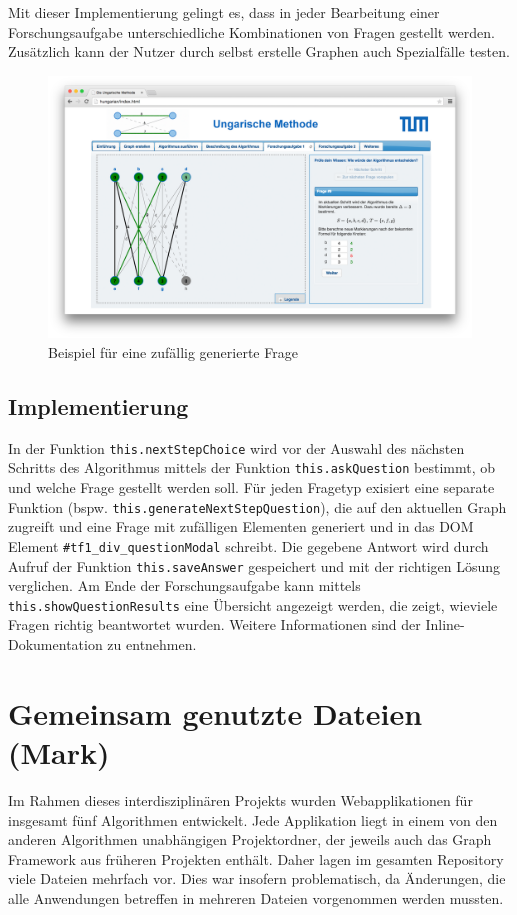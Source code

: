 Mit dieser Implementierung gelingt es, dass in jeder Bearbeitung einer Forschungsaufgabe unterschiedliche Kombinationen von Fragen gestellt werden. Zusätzlich kann der Nutzer durch selbst erstelle Graphen auch Spezialfälle testen.

\begin{figure}[h!]
	\centering
	\includegraphics[width=\textwidth]{figures/random_question}
	\caption[Zufällig generierte Frage]{Beispiel für eine zufällig generierte Frage}\label{fig:random-question}
\end{figure}

\subsection*{Implementierung}
In der Funktion \texttt{this.nextStepChoice} wird vor der Auswahl des nächsten Schritts des Algorithmus mittels der Funktion \texttt{this.askQuestion} bestimmt, ob und welche Frage gestellt werden soll. Für jeden Fragetyp exisiert eine separate Funktion (bspw. \texttt{this.generateNextStepQuestion}), die auf den aktuellen Graph zugreift und eine Frage mit zufälligen Elementen generiert und in das DOM Element \texttt{\#tf1\_div\_questionModal} schreibt. Die gegebene Antwort wird durch Aufruf der Funktion \texttt{this.saveAnswer} gespeichert und mit der richtigen Lösung verglichen. Am Ende der Forschungsaufgabe kann mittels \texttt{this.showQuestionResults} eine Übersicht angezeigt werden, die zeigt, wieviele Fragen richtig beantwortet wurden. Weitere Informationen sind der Inline-Dokumentation zu entnehmen.

\section{Gemeinsam genutzte Dateien (Mark)}
Im Rahmen dieses interdisziplinären Projekts wurden Webapplikationen für insgesamt fünf Algorithmen entwickelt. Jede Applikation liegt in einem von den anderen Algorithmen unabhängigen Projektordner, der jeweils auch das Graph Framework aus früheren Projekten enthält. Daher lagen im gesamten Repository viele Dateien mehrfach vor. Dies war insofern problematisch, da Änderungen, die alle Anwendungen betreffen in mehreren Dateien vorgenommen werden mussten.

